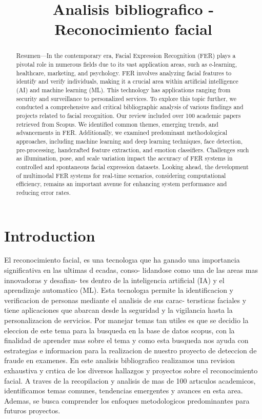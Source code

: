 \documentclass[conference]{IEEEtran}
\title{Analisis bibliografico - Reconocimiento facial}
\author{\IEEEauthorblockN{Sergio Peinado Cuevas - 506221009, Michael Esteban Castillo Lopez - 506221049}}
\begin{document}
\maketitle

\begin{abstract}
Resumen—In the contemporary era, Facial Expression Recognition (FER) plays a pivotal role in numerous fields due to its
vast application areas, such as e-learning, healthcare, marketing,
and psychology. FER involves analyzing facial features to identify
and verify individuals, making it a crucial area within artificial
intelligence (AI) and machine learning (ML). This technology has
applications ranging from security and surveillance to personalized services.
To explore this topic further, we conducted a comprehensive
and critical bibliographic analysis of various findings and projects
related to facial recognition. Our review included over 100
academic papers retrieved from Scopus. We identified common
themes, emerging trends, and advancements in FER. Additionally, we examined predominant methodological approaches,
including machine learning and deep learning techniques, face
detection, pre-processing, handcrafted feature extraction, and
emotion classifiers.
Challenges such as illumination, pose, and scale variation impact the accuracy of FER systems in controlled and spontaneous
facial expression datasets. Looking ahead, the development of
multimodal FER systems for real-time scenarios, considering
computational efficiency, remains an important avenue for enhancing system performance and reducing error rates.
\end{abstract}

\section{Introduction}

El reconocimiento facial, es una tecnologıa que ha ganado
una importancia significativa en las ultimas d ecadas, conso- 
lidandose como una de las areas mas innovadoras y desafian- 
tes dentro de la inteligencia artificial (IA) y el aprendizaje
automatico (ML). Esta tecnologıa permite la identificacion y 
verificacion de personas mediante el analisis de sus carac- 
terısticas faciales y tiene aplicaciones que abarcan desde la
seguridad y la vigilancia hasta la personalizacion de servicios. 
Por manejar temas tan utiles es que se decidio la eleccion de
este tema para la busqueda en la base de datos scopus, con la
finalidad de aprender mas sobre el tema y como esta busqueda
nos ayuda con estrategias e informacion para la realizacion de
nuestro proyecto de deteccion de fraude en examenes.
En este analisis bibliografico realizamos una revision
exhaustiva y crıtica de los diversos hallazgos y proyectos
sobre el reconocimiento facial. A traves de la recopilacion
y analisis de mas de 100 artıculos academicos, identificamos
temas comunes, tendencias emergentes y avances en esta area.
Ademas, se busca comprender los enfoques metodologicos
predominantes para futuros proyectos.
\end{document}
